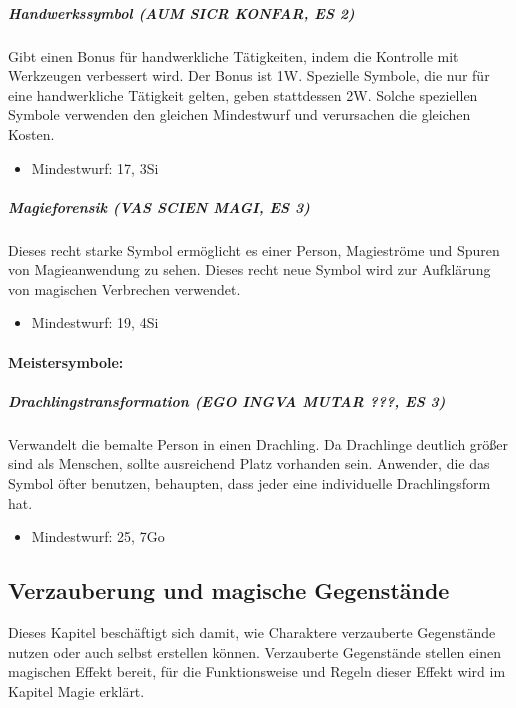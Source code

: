 \documentclass{article}
\begin{document}
\subparagraph{Handwerkssymbol (AUM SICR KONFAR, ES 2)}
Gibt einen Bonus für handwerkliche Tätigkeiten, indem die Kontrolle mit Werkzeugen verbessert wird. Der Bonus ist 1W. Spezielle Symbole, die nur für eine handwerkliche Tätigkeit gelten, geben stattdessen 2W. Solche speziellen Symbole verwenden den gleichen Mindestwurf und verursachen die gleichen Kosten.
\begin{itemize}
\item Mindestwurf: 17, 3Si
\end{itemize}

\subparagraph{Magieforensik (VAS SCIEN MAGI, ES 3)}
Dieses recht starke Symbol ermöglicht es einer Person, Magieströme und Spuren von Magieanwendung zu sehen. Dieses recht neue Symbol wird zur Aufklärung von magischen Verbrechen verwendet.
\begin{itemize}
\item Mindestwurf: 19, 4Si
\end{itemize}

\paragraph{Meistersymbole:}

\subparagraph{Drachlingstransformation (EGO INGVA MUTAR ???, ES 3)}
Verwandelt die bemalte Person in einen Drachling. Da Drachlinge deutlich größer sind als Menschen, sollte ausreichend Platz vorhanden sein. Anwender, die das Symbol öfter benutzen, behaupten, dass jeder eine individuelle Drachlingsform hat.
\begin{itemize}
\item Mindestwurf: 25, 7Go
\end{itemize}

\begin{center}
\section{Verzauberung und magische Gegenstände}
\end{center}

Dieses Kapitel beschäftigt sich damit, wie Charaktere verzauberte Gegenstände nutzen oder auch selbst erstellen können.
Verzauberte Gegenstände stellen einen magischen Effekt bereit, für die Funktionsweise und Regeln dieser Effekt wird im
Kapitel Magie erklärt.
\end{document}
